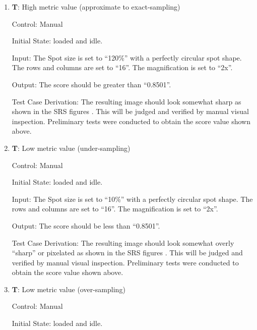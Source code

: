 \documentclass[12pt, titlepage]{article}
\newcounter{testnum} %
\begin{document}
\begin{enumerate}

  \item{\textbf{T\thetestnum \label{T_manualMetricHigh}}: High metric value (approximate to exact-sampling)\\}

    Control: Manual
              
    Initial State: \progname{} loaded and idle.
              
    Input: The Spot size is set to ``120\%'' with a perfectly circular spot shape.
      The rows and columns are set to ``16''.
      The magnification is set to ``2x''.
              
    Output: The score should be greater than ``0.8501''.

    Test Case Derivation: The resulting image should look somewhat sharp as shown in the SRS figures \citep{SRS}.
      This will be judged and verified by manual visual inspection.
      Preliminary tests were conducted to obtain the score value shown above.

  \item{\textbf{T\thetestnum \label{T_manualMetricLow}}: Low metric value (under-sampling)\\}

  Control: Manual
              
  Initial State: \progname{} loaded and idle.
            
  Input: The Spot size is set to ``10\%'' with a perfectly circular spot shape.
    The rows and columns are set to ``16''.
    The magnification is set to ``2x''.
            
  Output: The score should be less than ``0.8501''.

  Test Case Derivation: The resulting image should look somewhat overly ``sharp'' or
    pixelated as shown in the SRS figures \citep{SRS}.
    This will be judged and verified by manual visual inspection.
    Preliminary tests were conducted to obtain the score value shown above.

  \item{\textbf{T\thetestnum \label{T_manualMetricLow2}}: Low metric value (over-sampling)\\}

  Control: Manual
              
  Initial State: \progname{} loaded and idle.
            

\end{enumerate}
\end{document}
